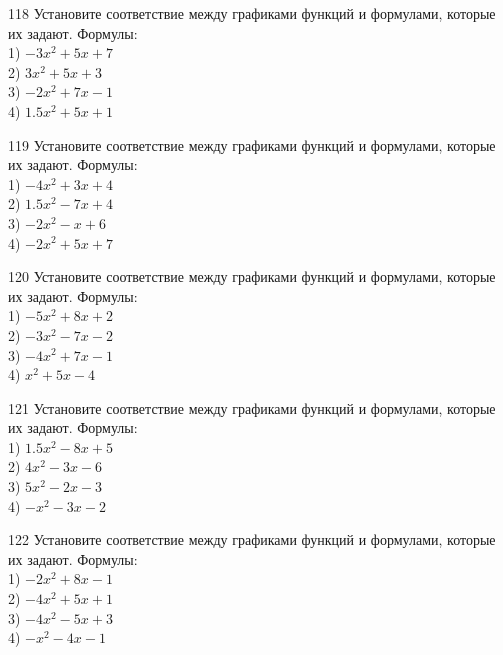 \documentclass[4apaper]{article}
\begin{document}
\begin{taskBN}{118}
Установите соответствие между графиками функций и формулами, которые их задают. Формулы: \\1) $-3x^2+5x+7$\\2) $3x^2+5x+3$\\3) $-2x^2+7x-1$\\4) $1.5x^2+5x+1$
\end{taskBN}

\begin{taskBN}{119}
Установите соответствие между графиками функций и формулами, которые их задают. Формулы: \\1) $-4x^2+3x+4$\\2) $1.5x^2-7x+4$\\3) $-2x^2-x+6$\\4) $-2x^2+5x+7$
\end{taskBN}

\begin{taskBN}{120}
Установите соответствие между графиками функций и формулами, которые их задают. Формулы: \\1) $-5x^2+8x+2$\\2) $-3x^2-7x-2$\\3) $-4x^2+7x-1$\\4) $x^2+5x-4$
\end{taskBN}

\begin{taskBN}{121}
Установите соответствие между графиками функций и формулами, которые их задают. Формулы: \\1) $1.5x^2-8x+5$\\2) $4x^2-3x-6$\\3) $5x^2-2x-3$\\4) $-x^2-3x-2$
\end{taskBN}

\begin{taskBN}{122}
Установите соответствие между графиками функций и формулами, которые их задают. Формулы: \\1) $-2x^2+8x-1$\\2) $-4x^2+5x+1$\\3) $-4x^2-5x+3$\\4) $-x^2-4x-1$
\end{taskBN}
\end{document}
